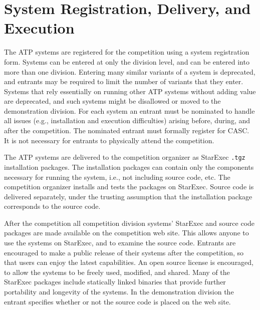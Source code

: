 \documentclass[aic]{iosart2x}
\newcommand{\smalltt}[1]{\small \texttt{#1}}
\begin{document}

\section{System Registration, Delivery, and Execution}
\label{Registration}

The ATP systems are registered for the competition 
using a system registration form.
Systems can be entered at only the division level, and can be entered into more than one division.
Entering many similar variants of a system is deprecated, and entrants may be required to limit
the number of variants that they enter.
Systems that rely essentially on running other ATP systems without adding value are deprecated, and
such systems might be disallowed or moved to the demonstration division.
For each system an entrant must be nominated to handle all issues (e.g., installation and execution
difficulties) arising before, during, and after the competition.
The nominated entrant must formally register for CASC.
It is not necessary for entrants to physically attend the competition.

The ATP systems are delivered to the competition organizer 
as StarExec \smalltt{.tgz} installation packages.
The installation packages can contain only the components necessary for running the system, i.e.,
not including source code, etc.
The competition organizer installs and tests the packages on StarExec.
Source code is delivered separately, under the trusting assumption that the installation package
corresponds to the source code.

After the competition all competition division systems' StarExec and source code packages are made
available on the competition web site.
This allows anyone to use the systems on StarExec, and to examine the source code.
Entrants are encouraged to make a public release of their systems after the competition, so
that users can enjoy the latest capabilities.
An open source license is encouraged, to allow the systems to be freely used, modified, and
shared.
Many of the StarExec packages include statically linked binaries that provide further portability
and longevity of the systems.
In the demonstration division the entrant specifies whether or not the source code is placed on
the web site.
\end{document}
